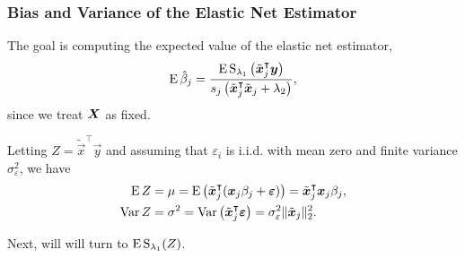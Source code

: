 \documentclass[10pt]{beamer}
\begin{document}
\begin{frame}[c]
  \frametitle{Bias and Variance of the Elastic Net Estimator}

  The goal is computing the expected value of the elastic net estimator,
  \[
    \operatorname{E} \hat\beta_j = \frac{\operatorname{E} \operatorname{S}_{\lambda_1}\left(\tilde{\boldsymbol{x}}_j^\intercal \boldsymbol{y}\right)}{s_j\left(\tilde{\boldsymbol{x}}_j^\intercal \tilde{\boldsymbol{x}}_j + \lambda_2\right)},
  \]
  since we treat \(\boldsymbol{X}\) as fixed.

  \bigskip\pause

  Letting \(Z = \tilde{\vec{x}}^\intercal \vec{y}\) and assuming that \(\varepsilon_i\) is i.i.d. with mean zero and finite variance \(\sigma_\varepsilon^2\), we have
  \begin{align*}
    \operatorname{E} Z   & = \mu = \operatorname{E} \left( \tilde{\boldsymbol{x}}_j^\intercal (\boldsymbol{x}_j\beta_j + \boldsymbol{\varepsilon}) \right)  = \tilde{\boldsymbol{x}}_j^\intercal\boldsymbol{x}_j \beta_j,  \\
    \operatorname{Var} Z & = \sigma^2 = \operatorname{Var}\left(\tilde{\boldsymbol{x}}_j ^\intercal \boldsymbol{\varepsilon}\right) = \sigma_\varepsilon^2 \lVert \tilde{\boldsymbol{x}}_j\rVert_2^2.
  \end{align*}

  \bigskip

  Next, will will turn to \(\operatorname{E} \operatorname{S}_{\lambda_1}(Z)\).
\end{frame}
\end{document}
